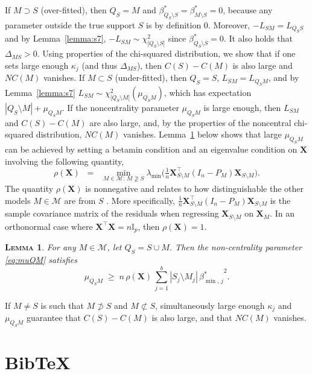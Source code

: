 \documentclass[
  12pt]{article}
\newcommand{\I}{\mathbb{I}}
\newcommand{\M}{\mathcal{M}}
\newcommand{\bX}{\mathbf{X}}
\newtheorem{lem}[thm]{\textsc{Lemma}}
\begin{document}
If $M\supset S$ (over-fitted), then $Q_S=M$ and $\beta^*_{Q_S\setminus S}=\beta^*_{M\setminus S}=0$, because any parameter outside the true support $S$ is by definition $0$. Moreover, $-L_{SM}=L_{Q_SS}$ and by Lemma~\ref{lemma:s7}, $-L_{SM}\sim \chi^2_{|Q_S\setminus S|}$ since $\beta^*_{Q_S\setminus S}=0$. It also holds that $\Delta_{MS}>0$. Using properties of the chi-squared distribution, we show that if one sets large enough $\kappa_j$ (and thus $\Delta_{MS}$), then $C(S)-C(M)$ is also large and $NC(M)$ vanishes. If $M\subset S$ (under-fitted), then $Q_S=S$, $L_{SM}=L_{Q_SM}$, and by Lemma~\ref{lemma:s7}
$L_{SM}\sim \chi^2_{|Q_S\setminus M|}(\mu_{Q_SM})$, which has expectation $|Q_S\setminus M|+\mu_{Q_SM}$.
If the noncentrality parameter $\mu_{Q_SM}$ is large enough, then $L_{SM}$ and $C(S)-C(M)$ are also large, and, by the properties of the noncentral chi-squared distribution, $NC(M)$ vanishes. Lemma~\ref{lem:boundrho} below shows that large $\mu_{Q_SM}$ can be achieved by setting a betamin condition and an eigenvalue condition on $\bX$ involving the following quantity,  
 \begin{equation}\label{eq:rhoX}
        \rho(\bX)\;\;=\;\;\min_{M \in \M:\, M\not \supseteq S} \lambda_{\min}\big(\tfrac{1}{n} \boldsymbol{X}_{S \setminus M}^{\top}\left(I_n- P_M\right) \boldsymbol{X}_{S \setminus M}\big).
    \end{equation}
The quantity $\rho(\bX)$ is nonnegative and relates to how distinguishable the other models $M\in \M$ are from $S$ \citep{infotheowainwright}.  More specifically, $\tfrac{1}{n} \boldsymbol{X}_{S \setminus M}^{\top}\left(I_n- P_M\right) \boldsymbol{X}_{S \setminus M}$ is the sample covariance matrix of the residuals when regressing $\boldsymbol{X}_{S \setminus M}$ on $\boldsymbol{X}_M$.
In an orthonormal case where $\bX^{\top}\bX=n\I_p$, then $\rho(\bX)=1$.  

\begin{lem}\label{lem:boundrho}
 For any $M\in\M$, let $Q_S=S \cup M$. Then the non-centrality parameter \eqref{eq:muQM} satisfies
    $$\mu_{Q_SM}\; \geq \;n\,\rho(\bX)\,\sum_{j=1}^b|S_j\setminus M_j|\,{\beta_{\min,\,j}^*}^2.$$
\end{lem}
If $M\neq S$ is such that $M\not\supset S$ and $M\not\subset S$, simultaneously large enough $\kappa_j$ and $\mu_{Q_S M}$ guarantee that $C(S)-C(M)$ is also large, and that $NC(M)$ vanishes.




\section{BibTeX}\label{bibtex}
\end{document}
